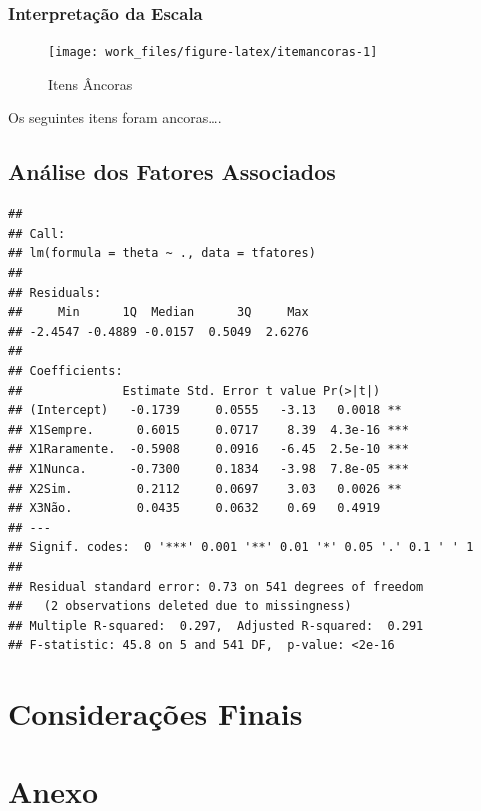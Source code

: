 \documentclass[]{article}
\begin{document}
\subsubsection{Interpretação da Escala}\label{interpretacao-da-escala}

\begin{figure}[H]

{\centering \texttt{[image: work\_files/figure-latex/itemancoras-1]} 

}

\caption{Itens Âncoras}\label{fig:itemancoras}
\end{figure}

Os seguintes itens foram ancoras\ldots{}.

\subsection{Análise dos Fatores
Associados}\label{analise-dos-fatores-associados}

\begin{verbatim}
## 
## Call:
## lm(formula = theta ~ ., data = tfatores)
## 
## Residuals:
##     Min      1Q  Median      3Q     Max 
## -2.4547 -0.4889 -0.0157  0.5049  2.6276 
## 
## Coefficients:
##              Estimate Std. Error t value Pr(>|t|)    
## (Intercept)   -0.1739     0.0555   -3.13   0.0018 ** 
## X1Sempre.      0.6015     0.0717    8.39  4.3e-16 ***
## X1Raramente.  -0.5908     0.0916   -6.45  2.5e-10 ***
## X1Nunca.      -0.7300     0.1834   -3.98  7.8e-05 ***
## X2Sim.         0.2112     0.0697    3.03   0.0026 ** 
## X3Não.         0.0435     0.0632    0.69   0.4919    
## ---
## Signif. codes:  0 '***' 0.001 '**' 0.01 '*' 0.05 '.' 0.1 ' ' 1
## 
## Residual standard error: 0.73 on 541 degrees of freedom
##   (2 observations deleted due to missingness)
## Multiple R-squared:  0.297,  Adjusted R-squared:  0.291 
## F-statistic: 45.8 on 5 and 541 DF,  p-value: <2e-16
\end{verbatim}

\section{Considerações Finais}\label{consideracoes-finais}

\hypertarget{Anexo}{\section{Anexo}\label{Anexo}}


\end{document}
